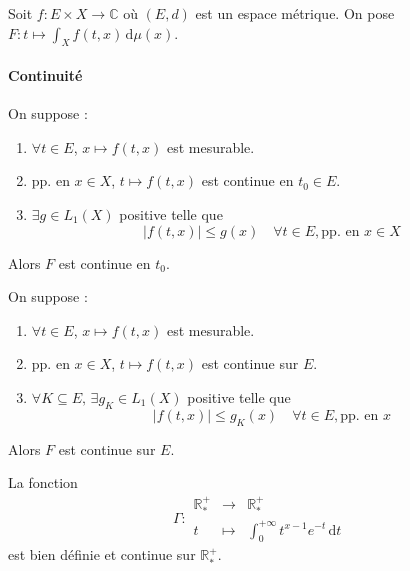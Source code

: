 
  Soit $f : E \times X \rightarrow \mathbb{C}$ où $(E, d)$ est un espace métrique. On pose $F : t \mapsto \int_X f(t, x) \, \mathrm{d}\mu(x)$.

  \paragraph{Continuité}

  \begin{theorem}
    On suppose :
    \begin{enumerate}[label=(\roman*)]
      \item $\forall t \in E$, $x \mapsto f(t,x)$ est mesurable.
      \item pp. en $x \in X$, $t \mapsto f(t,x)$ est continue en $t_0 \in E$.
      \item $\exists g \in L_1(X)$ positive telle que
      \[ |f(t,x)| \leq g(x) \quad \forall t \in E, \text{pp. en } x \in X \]
    \end{enumerate}
    Alors $F$ est continue en $t_0$.
  \end{theorem}

  \begin{corollary}
    On suppose :
    \begin{enumerate}[label=(\roman*)]
      \item $\forall t \in E$, $x \mapsto f(t,x)$ est mesurable.
      \item pp. en $x \in X$, $t \mapsto f(t,x)$ est continue sur $E$.
      \item $\forall K \subseteq E, \, \exists g_K \in L_1(X)$ positive telle que
      \[ |f(t,x)| \leq g_K(x) \quad \forall t \in E, \text{pp. en } x \]
    \end{enumerate}
    Alors $F$ est continue sur $E$.
  \end{corollary}


  \begin{example}
    \label{234-3}
    La fonction
    \[ \Gamma :
    \begin{array}{ccc}
      \mathbb{R}^+_* &\rightarrow& \mathbb{R}^+_* \\
      t &\mapsto& \int_{0}^{+\infty} t^{x-1} e^{-t} \, \mathrm{d}t
    \end{array}
    \]
    est bien définie et continue sur $\mathbb{R}^+_*$.
  \end{example}

